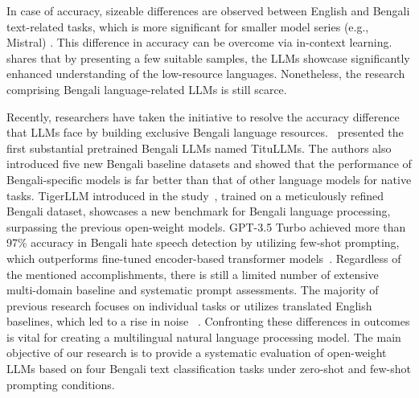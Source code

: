 \documentclass[10pt,letterpaper]{article}
\begin{document}
In case of accuracy, sizeable differences are observed between English and Bengali text-related tasks, which is more significant for smaller model series (e.g., Mistral) \cite{b6}. This difference in accuracy can be overcome via in-context learning. \cite{b43} shares that by presenting a few suitable samples, the LLMs showcase significantly enhanced understanding of the low-resource languages. Nonetheless, the research comprising Bengali language-related LLMs is still scarce.

Recently, researchers have taken the initiative to resolve the accuracy difference that LLMs face by building exclusive Bengali language resources.~\cite{b21} presented the first substantial pretrained Bengali LLMs named TituLLMs. The authors also introduced five new Bengali baseline datasets and showed that the performance of Bengali-specific models is far better than that of other language models for native tasks. TigerLLM introduced in the study~\cite{b10}, trained on a meticulously refined Bengali dataset, showcases a new benchmark for Bengali language processing, surpassing the previous open-weight models. GPT-3.5 Turbo achieved more than 97\% accuracy in Bengali hate speech detection by utilizing few-shot prompting, which outperforms fine-tuned encoder-based transformer models~\cite{b22}. Regardless of the mentioned accomplishments, there is still a limited number of extensive multi-domain baseline and systematic prompt assessments. The majority of previous research focuses on individual tasks or utilizes translated English baselines, which led to a rise in noise ~\cite{b6,b28}. Confronting these differences in outcomes is vital for creating a multilingual natural language processing model. The main objective of our research is to provide a systematic evaluation of open-weight LLMs based on four Bengali text classification tasks under zero-shot and few-shot prompting conditions.
\end{document}
